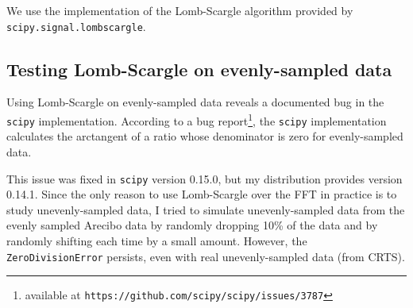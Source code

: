 \documentclass{article}
\theoremstyle{definition}
\newcommand{\cc}{\texttt}
\begin{document}
We use the implementation of the Lomb-Scargle algorithm provided by
\cc{scipy.signal.lombscargle}.

\subsection{Testing Lomb-Scargle on evenly-sampled data}

Using Lomb-Scargle on evenly-sampled data reveals a
documented bug in the \cc{scipy} implementation. According to a bug
report\footnote{available at
\cc{https://github.com/scipy/scipy/issues/3787}},
the \cc{scipy} implementation calculates the arctangent of a ratio
whose denominator is zero for evenly-sampled data.

This issue
was fixed in \cc{scipy} version 0.15.0, but my distribution provides
version 0.14.1.
Since the only reason to use Lomb-Scargle over
the FFT in practice is to study unevenly-sampled data, I tried to
simulate unevenly-sampled data from the evenly sampled Arecibo data
by randomly dropping 10\% of the data and by randomly shifting
each time by a small amount. However, the \cc{ZeroDivisionError}
persists, even with real unevenly-sampled data (from CRTS).
\end{document}
